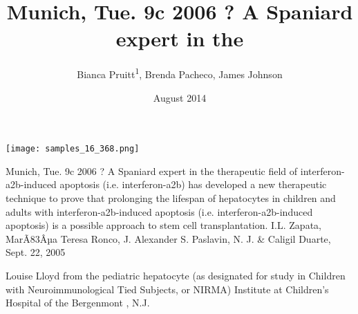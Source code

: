 \documentclass{article}
\title{Munich, Tue. 9c 2006 ? A Spaniard expert in the}
\author{Bianca Pruitt\textsuperscript{1},  Brenda Pacheco,  James Johnson}
\affil{\textsuperscript{1}Changsha University of Science and Technology}
\date{August 2014}
\begin{document}
\maketitle

\begin{center}
\begin{minipage}{0.75\linewidth}
\texttt{[image: samples\_16\_368.png]}
\end{minipage}
\end{center}

Munich, Tue. 9c 2006 ? A Spaniard expert in the therapeutic field of interferon-a2b-induced apoptosis (i.e. interferon-a2b) has developed a new therapeutic technique to prove that prolonging the lifespan of hepatocytes in children and adults with interferon-a2b-induced apoptosis (i.e. interferon-a2b-induced apoptosis) is a possible approach to stem cell transplantation. I.L. Zapata, MarÃ\x83Âµa Teresa Ronco, J. Alexander S. Paslavin, N. J. \& Caligil Duarte, Sept. 22, 2005

Louise Lloyd from the pediatric hepatocyte (as designated for study in Children with Neuroimmunological Tied Subjects, or NIRMA) Institute at Children's Hospital of the Bergenmont , N.J.
\end{document}
